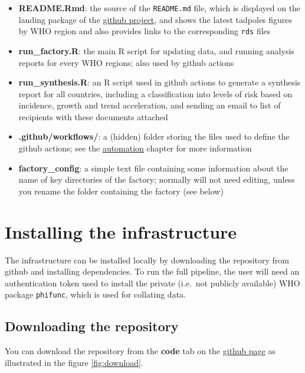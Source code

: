 \documentclass[]{book}
\begin{document}
\begin{itemize}
\item
  \textbf{README.Rmd}: the source of the \texttt{README.md} file, which is displayed on the
  landing package of the \href{https://github.com/whocov/trend_analysis_public}{github project},
  and shows the latest tadpoles figures by WHO region and also provides links to
  the corresponding \texttt{rds} files
\item
  \textbf{run\_factory.R}: the main R script for updating data, and running analysis
  reports for every WHO regions; also used by github actions
\item
  \textbf{run\_synthesis.R}: an R script used in github actions to generate a synthesis
  report for all countries, including a classification into levels of risk based
  on incidence, growth and trend acceleration, and sending an email to list of
  recipients with these documents attached
\item
  \textbf{.github/workflows/}: a (hidden) folder storing the files used to define the
  github actions; see the \protect\hyperlink{automation}{automation} chapter for more information
\item
  \textbf{factory\_config}: a simple text file containing some information about the
  name of key directories of the factory; normally will not need editing, unless
  you rename the folder containing the factory (see below)
\end{itemize}

\hypertarget{installing-the-infrastructure}{%
\section{Installing the infrastructure}\label{installing-the-infrastructure}}

The infrastructure can be installed locally by downloading the repository from
github and installing dependencies. To run the full pipeline, the user will need
an authentication token used to install the private (i.e.~not publicly
available) WHO package \texttt{phifunc}, which is used for collating data.

\hypertarget{downloading-the-repository}{%
\subsection{Downloading the repository}\label{downloading-the-repository}}

You can download the repository from the \textbf{code} tab on the
\href{https://github.com/whocov/trend_analysis_public}{github page}
as illustrated in the figure \ref{fig:download}.
\end{document}
